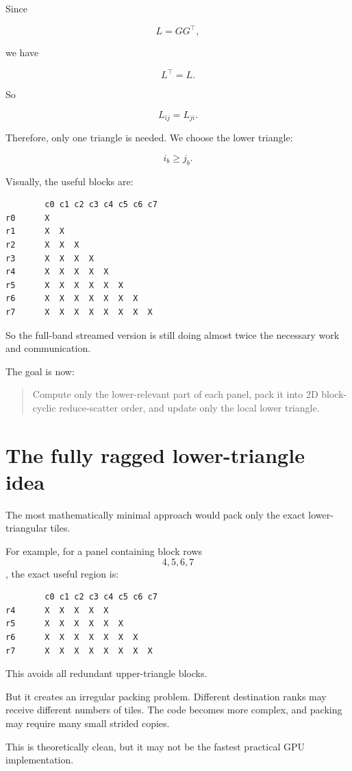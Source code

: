 \documentclass[11pt]{article}
\begin{document}
Since

$$
L = GG^\top,
$$

we have

$$
L^\top = L.
$$

So

$$
L_{ij} = L_{ji}.
$$

Therefore, only one triangle is needed. We choose the lower triangle:

$$
i_b \geq j_b.
$$

Visually, the useful blocks are:

\begin{lstlisting}
        c0 c1 c2 c3 c4 c5 c6 c7
r0      X
r1      X  X
r2      X  X  X
r3      X  X  X  X
r4      X  X  X  X  X
r5      X  X  X  X  X  X
r6      X  X  X  X  X  X  X
r7      X  X  X  X  X  X  X  X
\end{lstlisting}

So the full-band streamed version is still doing almost twice the necessary work and communication.

The goal is now:

\begin{quote}
Compute only the lower-relevant part of each panel, pack it into 2D block-cyclic reduce-scatter order, and update only the local lower triangle.
\end{quote}

\section{The fully ragged lower-triangle idea}

The most mathematically minimal approach would pack only the exact lower-triangular tiles.

For example, for a panel containing block rows $$4,5,6,7$$, the exact useful region is:

\begin{lstlisting}
        c0 c1 c2 c3 c4 c5 c6 c7
r4      X  X  X  X  X
r5      X  X  X  X  X  X
r6      X  X  X  X  X  X  X
r7      X  X  X  X  X  X  X  X
\end{lstlisting}

This avoids all redundant upper-triangle blocks.

But it creates an irregular packing problem. Different destination ranks may receive different numbers of tiles. The code becomes more complex, and packing may require many small strided copies.

This is theoretically clean, but it may not be the fastest practical GPU implementation.
\end{document}
